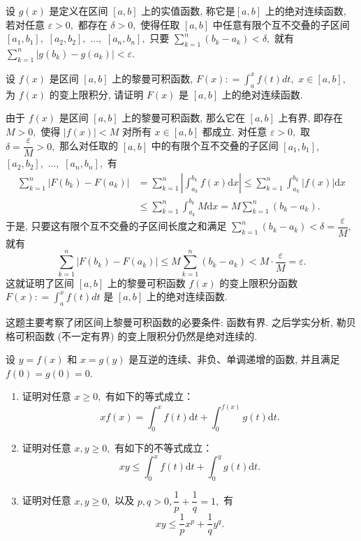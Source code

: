 
\begin{question}[points = 6]
  设 $g(x)$ 是定义在区间 $[a, b]$ 上的实值函数, 称它是$[a, b]$ 上的绝对连续函数, 若对任意 $\varepsilon > 0,$ 都存在 $\delta > 0,$ 使得任取 $[a, b]$ 中任意有限个互不交叠的子区间 $[a_1, b_1],$ $[a_2, b_2],$ $\dots,$ $[a_n, b_n],$ 只要 $\sum\limits_{k=1}^n (b_k - a_k) < \delta,$ 就有 $\sum\limits_{k=1}^n \lvert g(b_k) - g(a_k) \rvert < \varepsilon.$

  设 $f(x)$ 是区间 $[a, b]$ 上的黎曼可积函数, $F(x) : = \int_{a}^{x} f(t) dt,$ $x \in [a, b],$ 为 $f(x)$ 的变上限积分, 请证明 $F(x)$ 是 $[a, b]$ 上的绝对连续函数.

\end{question}

\begin{solution}
  由于 $f(x)$ 是区间 $[a, b]$ 上的黎曼可积函数, 那么它在 $[a, b]$ 上有界, 即存在 $M > 0,$ 使得 $\lvert f(x) \rvert < M$ 对所有 $x \in [a, b]$ 都成立. 对任意 $\varepsilon > 0,$ 取 $\delta = \dfrac{\varepsilon}{M} > 0,$ 那么对任取的 $[a, b]$ 中的有限个互不交叠的子区间 $[a_1, b_1],$ $[a_2, b_2],$ $\dots,$ $[a_n, b_n],$ 有
  \begin{align*}
    \sum\limits_{k=1}^n \lvert F(b_k) - F(a_k) \rvert & = \sum\limits_{k=1}^n \left\lvert \int_{a_k}^{b_k} f(x) \mathrm{d}x \right\rvert \leqslant \sum\limits_{k=1}^n \int_{a_k}^{b_k} \lvert f(x) \rvert \mathrm{d}x \\
    & \leqslant \sum\limits_{k=1}^n \int_{a_k}^{b_k} M \mathrm{d}x = M \sum\limits_{k=1}^n (b_k - a_k).
  \end{align*}
  于是, 只要这有限个互不交叠的子区间长度之和满足 $\sum\limits_{k=1}^n (b_k - a_k) < \delta = \dfrac{\varepsilon}{M},$ 就有
  $$\sum\limits_{k=1}^n \lvert F(b_k) - F(a_k) \rvert \leqslant M \sum\limits_{k=1}^n (b_k - a_k) < M \cdot \dfrac{\varepsilon}{M} = \varepsilon.$$
  这就证明了区间 $[a, b]$ 上的黎曼可积函数 $f(x)$ 的变上限积分函数$F(x) : = \int_{a}^{x} f(t) dt$ 是 $[a, b]$ 上的绝对连续函数.

  这题主要考察了闭区间上黎曼可积函数的必要条件: 函数有界. 之后学实分析, 勒贝格可积函数 (不一定有界) 的变上限积分仍然是绝对连续的.
\end{solution}

\begin{question}[points = 10]
  设 $y = f(x)$ 和 $x = g(y)$ 是互逆的连续、非负、单调递增的函数, 并且满足 $f(0) = g(0) = 0.$ 
  \begin{enumerate}
    \item 证明对任意 $x \geqslant 0,$ 有如下的等式成立：
    $$xf(x) = \int_0^x f(t) \mathrm{d}t + \int_0^{f(x)} g(t) \mathrm{d}t.$$
    \item 证明对任意 $x, y \geqslant 0,$ 有如下的不等式成立：
    $$xy \leqslant \int_0^x f(t) \mathrm{d}t + \int_0^y g(t) \mathrm{d}t.$$
    \item 证明对任意 $x, y \geqslant 0,$ 以及 $p, q > 0, \dfrac{1}{p} + \dfrac{1}{q} = 1,$ 有
    $$xy \leqslant \dfrac{1}{p} x^p + \dfrac{1}{q} y^q.$$
  \end{enumerate}

\end{question}

